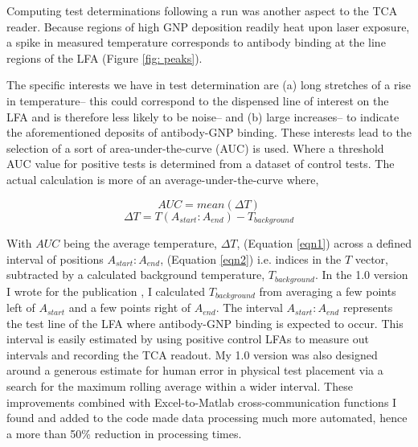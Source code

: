 Computing test determinations following a run was another aspect to the TCA reader. Because regions of high GNP deposition readily heat upon laser exposure, a spike in measured temperature corresponds to antibody binding at the line regions of the LFA (Figure \ref{fig: peaks}). 

The specific interests we have in test determination are (a) long stretches of a rise in temperature-- this could correspond to the dispensed line of interest on the LFA and is therefore less likely to be noise-- and (b) large increases-- to indicate the aforementioned deposits of antibody-GNP binding. These interests lead to the selection of a sort of area-under-the-curve (AUC) is used. Where a threshold AUC value for positive tests is determined from a dataset of control tests. The actual calculation is more of an average-under-the-curve where, \begin{center}
\begin{equation} \label{eqn1}
AUC=mean(\Delta T)
\end{equation}
\begin{equation} \label{eqn2}
\Delta T = T(A_{start}:A_{end})-T_{background}
\end{equation}
\end{center} 

With $AUC$ being the average temperature, $\Delta T$, (Equation \ref{eqn1}) across a defined interval of positions $A_{start}:A_{end}$, (Equation \ref{eqn2}) i.e. indices in the $T$ vector, subtracted by a calculated background temperature, $T_{background}$. In the 1.0 version I wrote for the publication \cite{Liu}, I calculated $T_{background}$ from averaging a few points left of $A_{start}$ and a few points right of $A_{end}$. %
The interval $A_{start}:A_{end}$ represents the test line of the LFA where antibody-GNP binding is expected to occur. This interval is easily estimated by using positive control LFAs to measure out intervals and recording the TCA readout. My 1.0 version was also designed around a generous estimate for human error in physical test placement via a search for the maximum rolling average within a wider interval. These improvements combined with Excel-to-Matlab cross-communication functions I found and added to the code made data processing much more automated, hence a more than 50\% reduction in processing times.

